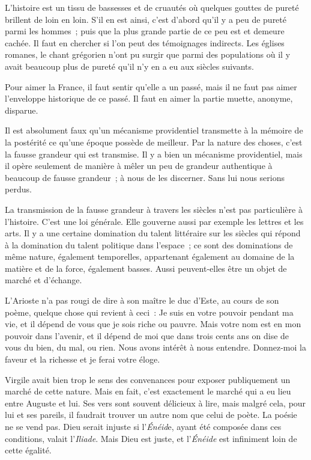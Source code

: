 \documentclass[french,twoside]{book} %
\begin{document}
L'histoire est un tissu de bassesses et de cruautés où quelques gouttes de pureté brillent de loin en loin. S'il en est ainsi, c'est d'abord qu'il y a peu de pureté parmi les hommes ; puis que la plus grande partie de ce peu est et demeure cachée. Il faut en chercher si l'on peut des témoignages indirects. Les églises romanes, le chant grégorien n'ont pu surgir que parmi des populations où il y avait beaucoup plus de pureté qu'il n'y en a eu aux siècles suivants.\par
Pour aimer la France, il faut sentir qu'elle a un passé, mais il ne faut pas aimer l'enveloppe historique de ce passé. Il faut en aimer la partie muette, anonyme, disparue.\par
\par
Il est absolument faux qu'un mécanisme providentiel transmette à la mémoire de la postérité ce qu'une époque possède de meilleur. Par la nature des choses, c'est la fausse grandeur qui est transmise. Il y a bien un mécanisme providentiel, mais il opère seulement de manière à mêler un peu de grandeur authentique à beaucoup de fausse grandeur ; à nous de les discerner. Sans lui nous serions perdus.\par
La transmission de la fausse grandeur à travers les siècles n'est pas particulière à l'histoire. C'est une loi générale. Elle gouverne aussi par exemple les lettres et les arts. Il y a une certaine domination du talent littéraire sur les siècles qui répond à la domination du talent politique dans l'espace ; ce sont des dominations de même nature, également temporelles, appartenant également au domaine de la matière et de la force, également basses. Aussi peuvent-elles être un objet de marché et d'échange.\par
L'Arioste n'a pas rougi de dire à son maître le duc d'Este, au cours de son poème, quelque chose qui revient à ceci : Je suis en votre pouvoir pendant ma vie, et il dépend de vous que je sois riche ou pauvre. Mais votre nom est en mon pouvoir dans l'avenir, et il dépend de moi que dans trois cents ans on dise de vous du bien, du mal, ou rien. Nous avons intérêt à nous entendre. Donnez-moi la faveur et la richesse et je ferai votre éloge.\par
Virgile avait bien trop le sens des convenances pour exposer publiquement un marché de cette nature. Mais en fait, c'est exactement le marché qui a eu lieu entre Auguste et lui. Ses vers sont souvent délicieux à lire, mais malgré cela, pour lui et ses pareils, il faudrait trouver un autre nom que celui de poète. La poésie ne se vend pas. Dieu serait injuste si l'{\itshape Énéid}e, ayant été composée dans ces conditions, valait l'{\itshape Iliade}. Mais Dieu est juste, et l'{\itshape Énéide} est infiniment loin de cette égalité.\par
\end{document}
